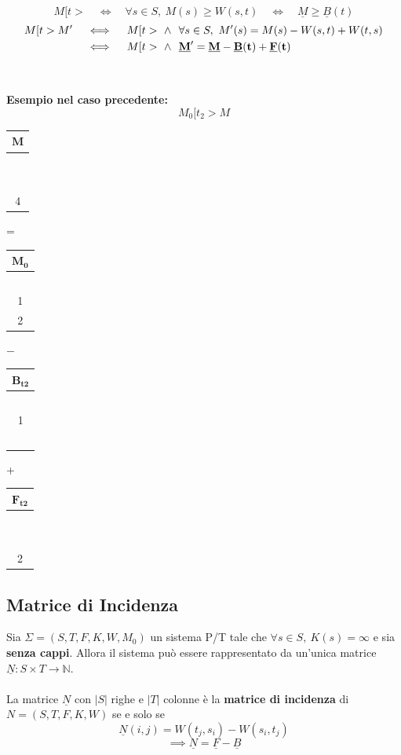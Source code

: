 \[
	M[t> \quad \iff \quad \forall s \in S, \ M(s) \geq W(s, t) \quad \iff \quad \underline M \geq \underline B(t)
\]
\vspace{1em}
\[
	\begin{aligned}
		M[t>M'
		\quad & \iff \quad
		M[t> \ \wedge \ \ \forall s \in S, \ M'(s) = M(s) - W(s, t) + W(t, s)
		\\
		      & \iff \quad
		M[t> \ \wedge \ \ \bf{\underline M' = \underline M - \underline B(t) + \underline F(t)}
	\end{aligned}
\]
\\
\\
\textbf{Esempio nel caso precedente:}
\[
	M_0[t_2>M
\]
\vspace{1em}
\begin{center}
	\begin{tabular}{|c|}
		\hline
		\textbf{$\mathbf{M}$} \\ \hline
		\                     \\ \hline
		\                     \\ \hline
		4                     \\ \hline
	\end{tabular}
	=
	\begin{tabular}{|c|}
		\hline
		$\mathbf{M_0}$ \\ \hline
		\              \\ \hline
		1              \\ \hline
		2              \\ \hline
	\end{tabular}
	$-$
	\begin{tabular}{|c|}
		\hline
		$\mathbf{B_{t2}}$ \\ \hline
		\                 \\ \hline
		1                 \\ \hline
		\                 \\ \hline
	\end{tabular}
	+
	\begin{tabular}{|c|}
		\hline
		$\mathbf{F_{t2}}$ \\ \hline
		\                 \\ \hline
		\                 \\ \hline
		2                 \\ \hline
	\end{tabular}
\end{center}

\subsection{Matrice di Incidenza}
Sia $\Sigma = (S, T, F, K, W, M_0)$ un sistema P/T tale che $\forall s \in S, \ K(s) = \infty$ e sia \textbf{senza cappi}. Allora il sistema può essere rappresentato da un'unica matrice $\underline N : S \times T \to \mathbb N$.
\\
\\
La matrice $\underline N$ con $|S|$ righe e $|T|$ colonne è la \textbf{matrice di incidenza} di $N = (S, T, F, K, W)$ se e solo se
\[
	\underline N(i, j) = W(t_j, s_i) - W(s_i, t_j)
\]
\[
	\implies \underline N = \underline F - \underline B
\]

